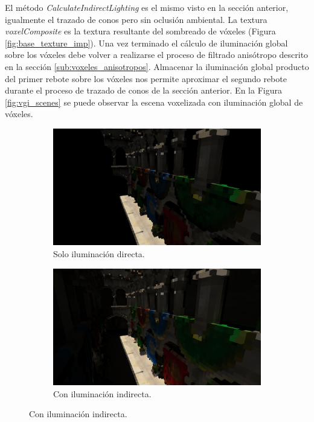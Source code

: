 El método \emph{CalculateIndirectLighting} es el mismo visto en la sección anterior, igualmente el trazado de conos pero sin oclusión ambiental. La textura \emph{voxelComposite} es la textura resultante del sombreado de vóxeles (Figura \ref{fig:base_texture_imp}). Una vez terminado el cálculo de iluminación global sobre los vóxeles debe volver a realizarse el proceso de filtrado anisótropo descrito en la sección \ref{sub:voxeles_anisotropos}. Almacenar la iluminación global producto del primer rebote sobre los vóxeles nos permite aproximar el segundo rebote durante el proceso de trazado de conos de la sección anterior. En la Figura \ref{fig:vgi_scenes} se puede observar la escena voxelizada con iluminación global de vóxeles.
\begin{figure}[H]
	\centering
	\begin{subfigure}[t]{0.35\textwidth}
		\centering
		\captionsetup{justification=centering}
		\caption*{Solo iluminación directa.}
		\includegraphics[width=\linewidth]{media/voxel_direct.png}
	\end{subfigure}%
	\hspace{0.05\textwidth}
	\begin{subfigure}[t]{0.35\textwidth}
		\centering
		\captionsetup{justification=centering}
		\caption*{Con iluminación indirecta.}
		\includegraphics[width=\linewidth]{media/voxel_gi.png}

\end{subfigure}
\end{figure}
